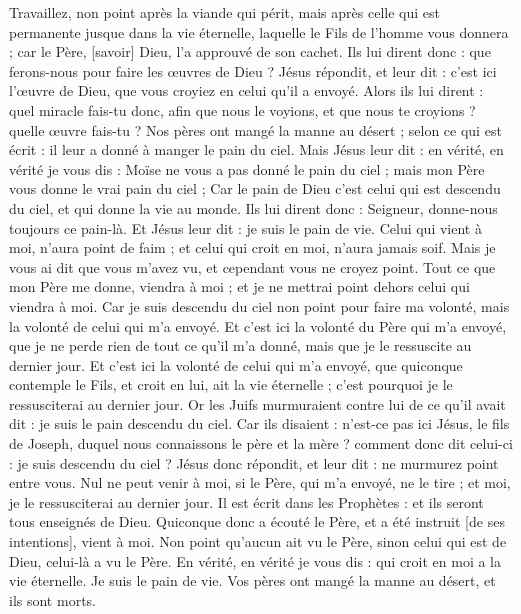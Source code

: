 \begin{multicols}{2}
Travaillez, non point après la viande qui périt, mais après celle qui est permanente jusque dans la vie éternelle, laquelle le Fils de l'homme vous donnera ; car le Père, [savoir] Dieu, l'a approuvé de son cachet.
Ils lui dirent donc : que ferons-nous pour faire les œuvres de Dieu ?
Jésus répondit, et leur dit : c'est ici l'œuvre de Dieu, que vous croyiez en celui qu'il a envoyé.
Alors ils lui dirent : quel miracle fais-tu donc, afin que nous le voyions, et que nous te croyions ? quelle œuvre fais-tu ?
Nos pères ont mangé la manne au désert ; selon ce qui est écrit : il leur a donné à manger le pain du ciel.
Mais Jésus leur dit : en vérité, en vérité je vous dis : Moïse ne vous a pas donné le pain du ciel ; mais mon Père vous donne le vrai pain du ciel ;
Car le pain de Dieu c'est celui qui est descendu du ciel, et qui donne la vie au monde.
Ils lui dirent donc : Seigneur, donne-nous toujours ce pain-là.
Et Jésus leur dit : je suis le pain de vie. Celui qui vient à moi, n'aura point de faim ; et celui qui croit en moi, n'aura jamais soif.
Mais je vous ai dit que vous m'avez vu, et cependant vous ne croyez point.
Tout ce que mon Père me donne, viendra à moi ; et je ne mettrai point dehors celui qui viendra à moi.
Car je suis descendu du ciel non point pour faire ma volonté, mais la volonté de celui qui m'a envoyé.
Et c'est ici la volonté du Père qui m'a envoyé, que je ne perde rien de tout ce qu'il m'a donné, mais que je le ressuscite au dernier jour.
Et c'est ici la volonté de celui qui m'a envoyé, que quiconque contemple le Fils, et croit en lui, ait la vie éternelle ; c'est pourquoi je le ressusciterai au dernier jour.
Or les Juifs murmuraient contre lui de ce qu'il avait dit : je suis le pain descendu du ciel.
Car ils disaient : n'est-ce pas ici Jésus, le fils de Joseph, duquel nous connaissons le père et la mère ? comment donc dit celui-ci : je suis descendu du ciel ?
Jésus donc répondit, et leur dit : ne murmurez point entre vous.
Nul ne peut venir à moi, si le Père, qui m'a envoyé, ne le tire ; et moi, je le ressusciterai au dernier jour.
Il est écrit dans les Prophètes : et ils seront tous enseignés de Dieu. Quiconque donc a écouté le Père, et a été instruit [de ses intentions], vient à moi.
Non point qu'aucun ait vu le Père, sinon celui qui est de Dieu, celui-là a vu le Père.
En vérité, en vérité je vous dis : qui croit en moi a la vie éternelle.
Je suis le pain de vie.
Vos pères ont mangé la manne au désert, et ils sont morts.

\end{multicols}
